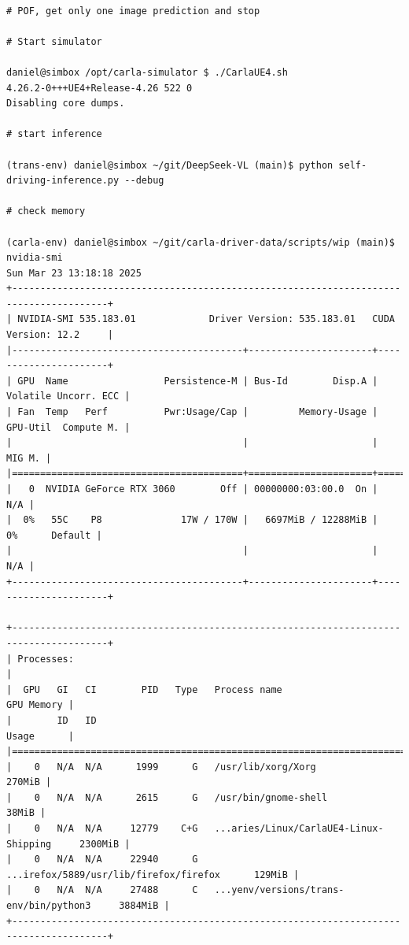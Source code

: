 \begin{verbatim}

# POF, get only one image prediction and stop

# Start simulator

daniel@simbox /opt/carla-simulator $ ./CarlaUE4.sh 
4.26.2-0+++UE4+Release-4.26 522 0
Disabling core dumps.

# start inference

(trans-env) daniel@simbox ~/git/DeepSeek-VL (main)$ python self-driving-inference.py --debug

# check memory

(carla-env) daniel@simbox ~/git/carla-driver-data/scripts/wip (main)$ nvidia-smi
Sun Mar 23 13:18:18 2025       
+---------------------------------------------------------------------------------------+
| NVIDIA-SMI 535.183.01             Driver Version: 535.183.01   CUDA Version: 12.2     |
|-----------------------------------------+----------------------+----------------------+
| GPU  Name                 Persistence-M | Bus-Id        Disp.A | Volatile Uncorr. ECC |
| Fan  Temp   Perf          Pwr:Usage/Cap |         Memory-Usage | GPU-Util  Compute M. |
|                                         |                      |               MIG M. |
|=========================================+======================+======================|
|   0  NVIDIA GeForce RTX 3060        Off | 00000000:03:00.0  On |                  N/A |
|  0%   55C    P8              17W / 170W |   6697MiB / 12288MiB |      0%      Default |
|                                         |                      |                  N/A |
+-----------------------------------------+----------------------+----------------------+
                                                                                         
+---------------------------------------------------------------------------------------+
| Processes:                                                                            |
|  GPU   GI   CI        PID   Type   Process name                            GPU Memory |
|        ID   ID                                                             Usage      |
|=======================================================================================|
|    0   N/A  N/A      1999      G   /usr/lib/xorg/Xorg                          270MiB |
|    0   N/A  N/A      2615      G   /usr/bin/gnome-shell                         38MiB |
|    0   N/A  N/A     12779    C+G   ...aries/Linux/CarlaUE4-Linux-Shipping     2300MiB |
|    0   N/A  N/A     22940      G   ...irefox/5889/usr/lib/firefox/firefox      129MiB |
|    0   N/A  N/A     27488      C   ...yenv/versions/trans-env/bin/python3     3884MiB |
+---------------------------------------------------------------------------------------+


\end{verbatim}
